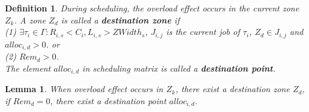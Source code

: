 \documentclass{article}
\begin{document}
\newtheorem{defi}{Definition}
\newtheorem{lemm}{Lemma}

\begin{defi}
	During scheduling, the overload effect occurs in the current zone $Z_k$. A zone $Z_d$ is called a \textbf{destination zone} if \\
	(1) $\exists \tau_i \in \Gamma : R_{i,s} < C_i, L_{i,s} > ZWidth_s$, $J_{i,j}$ is the current job of $\tau_i$, $Z_d \in J_{i,j}$ and $alloc_{i,d}>0$. or\\
	(2) $Rem_d > 0$. \\ 
	The element $alloc_{i,d}$ in scheduling matrix is called a \textbf{destination point}.
\end{defi}

\begin{lemm}
	When overload effect occurs in $Z_k$, there exist a destination zone $Z_d$, if $Rem_d=0$, there exist a destination point $alloc_{i,d}$.
\end{lemm}
\end{document}
